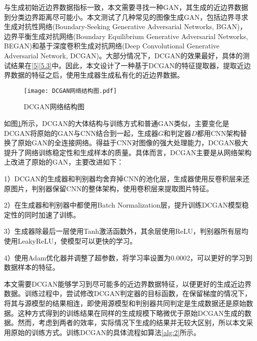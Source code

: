 与生成初始近边界数据指标一致，本文需要寻找一种GAN，其生成的近边界数据到分类边界距离尽可能小。本文测试了几种常见的图像生成GAN，包括边界寻求生成对抗性网络(Boundary-Seeking Generative Adversarial Networks, BGAN)\cite{devon2017boundary}，边界平衡生成对抗网络(Boundary Equilibrium Generative Adversarial Networks, BEGAN)\cite{berthelot2017began}和基于深度卷积生成对抗网络(Deep Convolutional Generative Adversarial Network, DCGAN)\cite{radford2015unsupervised}。大部分情况下，DCGAN的效果最好，具体的测试结果在\ref{5}\ref{5.3}中。因此，本文设计了一种基于DCGAN的特征提取器，提取近边界数据的特征之后，使用生成器生成私有化的近边界数据。

\begin{figure}[htbp]%
	\centering
	\setlength{\abovecaptionskip}{5mm} %
	\setlength{\belowcaptionskip}{-3mm} %
	\texttt{[image: DCGAN网络结构图.pdf]}
	\caption{DCGAN网络结构图}
	\label{DCGAN网络结构图}
	\end {figure}
	
如图\ref{DCGAN网络结构图}所示，DCGAN的大体结构与训练方式和普通GAN类似，主要变化是DCGAN将原始的GAN与CNN结合到一起，生成器$G$和判定器$D$都用CNN架构替换了原始GAN的全连接网络。得益于CNN对图像的强大处理能力，DCGAN极大提升了网络训练稳定性和生成样本的质量。具体而言，DCGAN主要是从网络架构上改进了原始的GAN，主要改进如下：

1）DCGAN的生成器和判别器均舍弃掉CNN的池化层，生成器使用反卷积层来还原图片，判别器保留CNN的整体架构，使用卷积层来提取图片特征。

2）在生成器和判别器中都使用Batch Normalization层，提升训练DCGAN模型稳定性的同时加速了训练。

3）生成器除最后一层使用Tanh激活函数外，其余层使用ReLU，判别器所有层均使用LeakyReLU，使模型可以更快的学习。

4）使用Adam优化器并调整了超参数，将学习率设置为0.0002，可以更好的学习到数据样本的特征。

本文需要DCGAN能够学习到尽可能多的近边界数据特征，以便更好的生成近边界数据。训练过程中，尝试修改DCGAN判定器的目标函数，在保留梯度的情况下，将其与源模型的结果相连，即使用源模型和判别器共同判定是生成数据还是原始数据。这种方式得到的训练结果在同样的生成规模下略微优于原始DCGAN生成的数据。然而，考虑到两者的效率，实际情况下生成的结果并无较大区别，所以本文采用原始的训练方式。训练DCGAN的具体流程如算法\ref{alg:2}所示。

